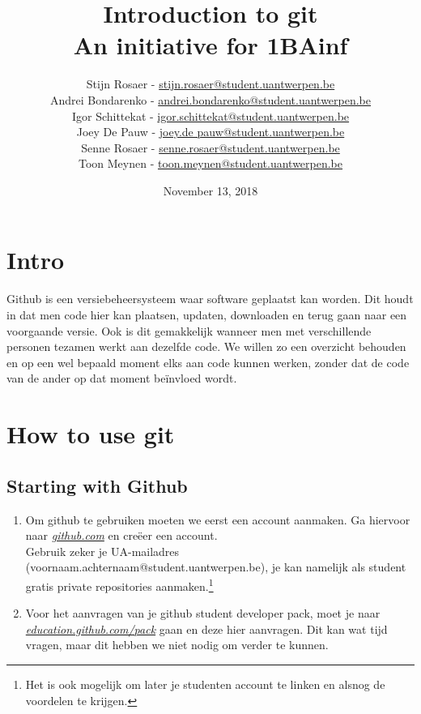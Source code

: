 \documentclass[a4paper, titlepage]{article}
\makeatletter
\newcommand*{\email}[1]{\href{mailto:#1}{#1}}
\newcommand*{\uaEmail}[2]{\email{\lowercase{#1}.\lowercase{#2}@student.uantwerpen.be}}
\newcommand*{\nameAndMail}[2]{#1 #2 - \uaEmail{#1}{#2}}
\makeatother
\begin{document}
	\title{Introduction to git\\ \large An initiative for 1BAinf}
	\date{November 13, 2018}

	\author{
		\nameAndMail{Stijn}{Rosaer} \\
		\nameAndMail{Andrei}{Bondarenko} \\
		\nameAndMail{Igor}{Schittekat} \\
		\nameAndMail{Joey}{De Pauw} \\
		\nameAndMail{Senne}{Rosaer} \\
		\nameAndMail{Toon}{Meynen}
	}
	\maketitle
	\tableofcontents
	
	\section{Intro}
		Github is een versiebeheersysteem waar software geplaatst kan worden. Dit houdt in dat men code hier kan plaatsen, updaten, downloaden en terug gaan naar een voorgaande versie. Ook is dit gemakkelijk wanneer men met verschillende personen tezamen werkt aan dezelfde code. We willen zo een overzicht behouden en op een wel bepaald moment elks aan code kunnen werken, zonder dat de code van de ander op dat moment be\"invloed wordt.
	

	\pagebreak
	
	\section{How to use git}
		\subsection{Starting with Github}
			\begin{enumerate}
				\item Om github te gebruiken moeten we eerst een account aanmaken. Ga hiervoor naar \href{https://github.com/}{\textit{github.com}} en cre\"eer een account.\\	
				Gebruik zeker je UA-mailadres (voornaam.achternaam@student.uantwerpen.be), je kan namelijk als student gratis private repositories aanmaken.\footnote{Het is ook mogelijk om later je studenten account te linken en alsnog de voordelen te krijgen.}
				\item Voor het aanvragen van je github student developer pack, moet je naar  \href{https://education.github.com/pack}{\textit{education.github.com/pack}} gaan en deze hier aanvragen. Dit kan wat tijd vragen, maar dit hebben we niet nodig om verder te kunnen.
			\end{enumerate}
\end{document}

